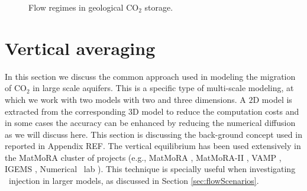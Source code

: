 \begin{figure}[tbp!]%
  \hspace{0.2cm}
  \hspace{0.1cm}
  \caption{Flow regimes in geological $\mbox{CO}_2$ storage.}
 \label{fig:Frc}
\end{figure}


\section{Vertical averaging}

In this section we discuss the common approach used in modeling the migration
of $\mbox{CO}_2$ in large scale aquifers. This is a specific type of multi-scale
modeling, at which we work with two models with two and three
dimensions. A $2\mbox{D}$ model is extracted from the corresponding $3\mbox{D}$ 
model to reduce the computation costs and in some cases the accuracy can be
enhanced by reducing the numerical diffusion as we will discuss here. This section is discussing the back-ground concept used in \cite{moll2011field} reported in Appendix REF. The vertical equilibrium has been used extensively in the MatMoRA cluster of projects (e.g., MatMoRA \cite{matmora1}, MatMoRA-II \cite{matmora2}, VAMP \cite{vamp}, IGEMS \cite{syversveenstudy}, Numerical \coo\ lab \cite{coolab}). This technique is specially useful when investigating \coo\ injection in larger models, as discussed in Section \ref{sec:flowScenarios}. 

